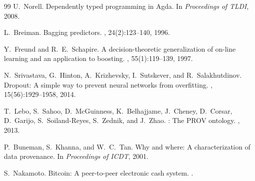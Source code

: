 \documentclass[11pt,a4paper]{article}
\begin{document}
\begin{thebibliography}{99}
U.~Norell.
\newblock Dependently typed programming in {Agda}.
\newblock In {\em Proceedings of TLDI}, 2008.

L.~Breiman.
\newblock Bagging predictors.
, 24(2):123--140, 1996.

Y.~Freund and R.~E.~Schapire.
\newblock A decision-theoretic generalization of on-line learning and an
  application to boosting.
, 55(1):119--139, 1997.

N.~Srivastava, G.~Hinton, A.~Krizhevsky, I.~Sutskever, and
R.~Salakhutdinov.
\newblock Dropout: A simple way to prevent neural networks from overfitting.
, 15(56):1929--1958, 2014.

T.~Lebo, S.~Sahoo, D.~McGuinness, K.~Belhajjame, J.~Cheney, D.~Corsar,
D.~Garijo, S.~Soiland-Reyes, S.~Zednik, and J.~Zhao.
: The {PROV} ontology.
, 2013.

P.~Buneman, S.~Khanna, and W.~C.~Tan.
\newblock Why and where: A characterization of data provenance.
\newblock In {\em Proceedings of ICDT}, 2001.

S.~Nakamoto.
\newblock Bitcoin: A peer-to-peer electronic cash system.
.

\end{thebibliography}
\end{document}

